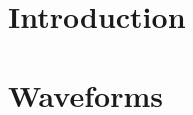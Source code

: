 \documentclass[aps,
prd,
twocolumn,
superscriptaddress,
lengthcheck,showpacs,letterpaper,nofootinbib,
floatfix]{revtex4-1}
\newcommand{\blue}{\textcolor{blue}}
\begin{document}
\begin{abstract}
%
\end{abstract}
\maketitle
\section{Introduction}


\section{Waveforms}\label{s1:waveforms}
\end{document}
